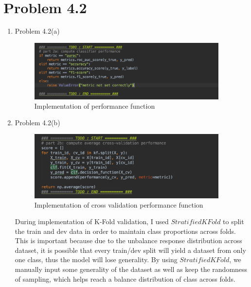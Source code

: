 \documentclass[11pt]{article}
\newcommand{\solution}[1]{{{\color{black}{\bf Solution:} {#1}}}}
\begin{document}
\vspace{5cm}
\newpage

\section{Problem 4.2}

\begin{enumerate}

\item Problem 4.2(a)

\solution{

	\begin{figure}[h!]
	\centering
	\includegraphics[width = 10cm]{4_2a}
	\caption{Implementation of performance function}
	\end{figure}
	
}

\vspace{2cm}

\item Problem 4.2(b)

\solution{
	
	\begin{figure}[h!]
	\centering
	\includegraphics[width = 10cm]{42b}
	\caption{Implementation of cross validation performance function}
	\end{figure}
	
	During implementation of K-Fold validation, I used $StratifiedKFold$ to split the train and dev data in order to maintain class proportions across folds. This is important because due to the unbalance response distribution across dataset, it is possible that every train/dev split will yield a dataset from only one class, thus the model will lose generality. By using $StratifiedKFold$, we manually input some generality of the dataset as well as keep the randomness of sampling, which helps reach a balance distribution of class across folds.
	
}
\end{enumerate}
\end{document}
